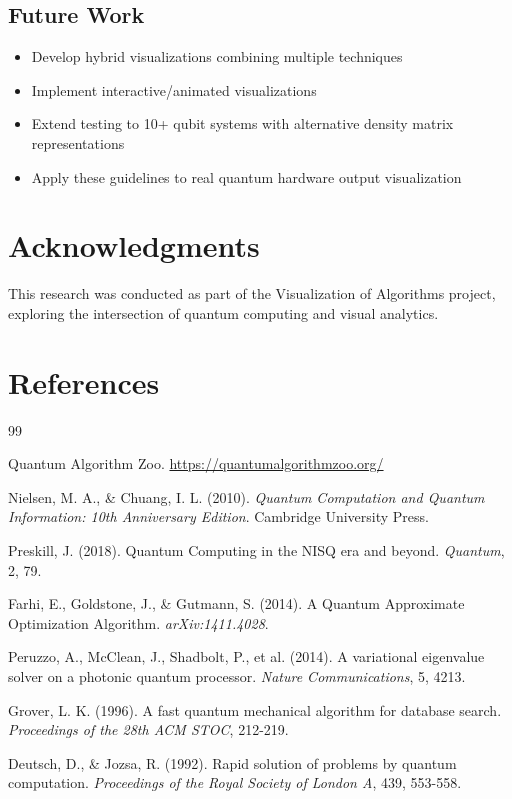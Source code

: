 \documentclass[12pt,a4paper]{article}
\begin{document}
\subsection{Future Work}

\begin{itemize}
	\item Develop hybrid visualizations combining multiple techniques
	\item Implement interactive/animated visualizations
	\item Extend testing to 10+ qubit systems with alternative density matrix representations
	\item Apply these guidelines to real quantum hardware output visualization
\end{itemize}

\newpage

\section*{Acknowledgments}

This research was conducted as part of the Visualization of Algorithms project, exploring the intersection of quantum computing and visual analytics.

\newpage

\section*{References}

\begin{thebibliography}{99}


	\item Quantum Algorithm Zoo. \url{https://quantumalgorithmzoo.org/}

	\item Nielsen, M. A., \& Chuang, I. L. (2010). \textit{Quantum Computation and Quantum Information: 10th Anniversary Edition}. Cambridge University Press.

	\item Preskill, J. (2018). Quantum Computing in the NISQ era and beyond. \textit{Quantum}, 2, 79.

	\item Farhi, E., Goldstone, J., \& Gutmann, S. (2014). A Quantum Approximate Optimization Algorithm. \textit{arXiv:1411.4028}.

	\item Peruzzo, A., McClean, J., Shadbolt, P., et al. (2014). A variational eigenvalue solver on a photonic quantum processor. \textit{Nature Communications}, 5, 4213.

	\item Grover, L. K. (1996). A fast quantum mechanical algorithm for database search. \textit{Proceedings of the 28th ACM STOC}, 212-219.

	\item Deutsch, D., \& Jozsa, R. (1992). Rapid solution of problems by quantum computation. \textit{Proceedings of the Royal Society of London A}, 439, 553-558.

\end{thebibliography}
\end{document}
